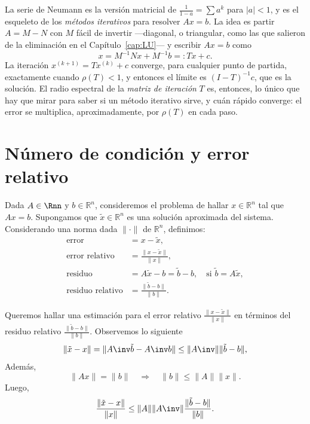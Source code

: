 \begin{remark}\label{obs:neumann-iterativos}
La serie de Neumann es la versión matricial de $\frac1{1-a}=\sum a^k$ para
$|a|<1$, y es el esqueleto de los \emph{métodos iterativos} para resolver
$Ax=b$. La idea es partir $A=M-N$ con $M$ fácil de invertir ---diagonal, o
triangular, como las que salieron de la eliminación en el
Capítulo~\ref{cap:LU}--- y escribir $Ax=b$ como
\[
x = M^{-1}Nx + M^{-1}b =: Tx + c .
\]
La iteración $x^{(k+1)}=Tx^{(k)}+c$ converge, para cualquier punto de partida,
exactamente cuando $\rho(T)<1$, y entonces el límite es
$(I-T)^{-1}c$, que es la solución. El radio espectral de la \emph{matriz de
iteración} $T$ es, entonces, lo único que hay que mirar para saber si un
método iterativo sirve, y cuán rápido converge: el error se multiplica,
aproximadamente, por $\rho(T)$ en cada paso.
\end{remark}

\section{Número de condición y error relativo}

Dada $A\in\Rnn$ y $b \in \mathbb{R}^n$, consideremos el problema de hallar $x \in \mathbb{R}^n$ tal que $Ax = b$. Supongamos que $\tilde x \in\mathbb{R}^n$ es una solución aproximada del sistema. Considerando una norma dada $\| \cdot \|$ de $\mathbb{R}^n$, definimos:
\begin{align*}
  \text{error} &=  x - \tilde x , \\
  \text{error relativo} &= \frac{ \| x - \tilde x \| }{ \| x \| },\\
  \text{residuo} &= A\tilde x - b = \tilde b - b, \quad\text{si $\tilde b = A \tilde x$},\\
  \text{residuo relativo} &= \frac{ \|\tilde b - b\|}{\|b\|}.
\end{align*}

Queremos hallar una estimación para el error relativo $\frac{ \| x - \tilde x \| }{ \| x \| }$ en términos del residuo relativo $ \frac{ \|\tilde b - b\|}{\|b\|}$.
Observemos lo siguiente
\[
\| \tilde x - x \| = \| A\inv \tilde b - A\inv b \| \le \| A\inv \| \| \tilde b - b \|,
\]
Además,
\[
\| A x \| = \| b \| \quad\Longrightarrow\quad \| b \| \le \| A \| \| x \|.
\]
Luego,
\begin{equation}\label{eq:err_rel1}
\frac{\| \tilde x - x \| }{\| x \|}
\le \| A \| \| A\inv\| \frac{\| \tilde b - b \|}{\| b \|}.
\end{equation}

